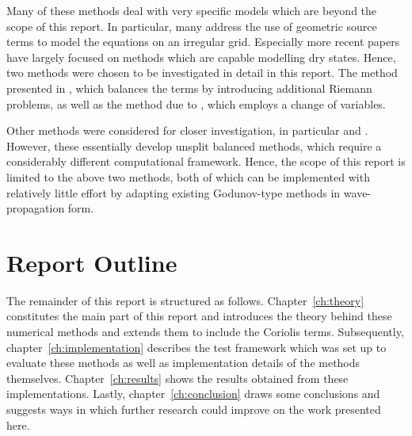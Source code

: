Many of these methods deal with very specific models which are beyond the scope of this report. In particular, many address the use of geometric source terms to model the equations on an irregular grid. Especially more recent papers have largely focused on methods which are capable modelling dry states. Hence, two methods were chosen to be investigated in detail in this report. The method presented in \citet{leveque1998balancing}, which balances the terms by introducing additional Riemann problems, as well as the method due to \citet{rogers2003mathematical}, which employs a change of variables.

Other methods were considered for closer investigation, in particular \citet{hubbard2000flux} and \citet{chertockwell}. However, these essentially develop unsplit balanced methods, which require a considerably different computational framework. Hence, the scope of this report is limited to the above two methods, both of which can be implemented with relatively little effort by adapting existing Godunov-type methods in wave-propagation form.

\section{Report Outline}

The remainder of this report is structured as follows. Chapter~\ref{ch:theory} constitutes the main part of this report and introduces the theory behind these numerical methods and extends them to include the Coriolis terms. Subsequently, chapter~\ref{ch:implementation} describes the test framework which was set up to evaluate these methods as well as implementation details of the methods themselves. Chapter~\ref{ch:results} shows the results obtained from these implementations. Lastly, chapter~\ref{ch:conclusion} draws some conclusions and suggests ways in which further research could improve on the work presented here.